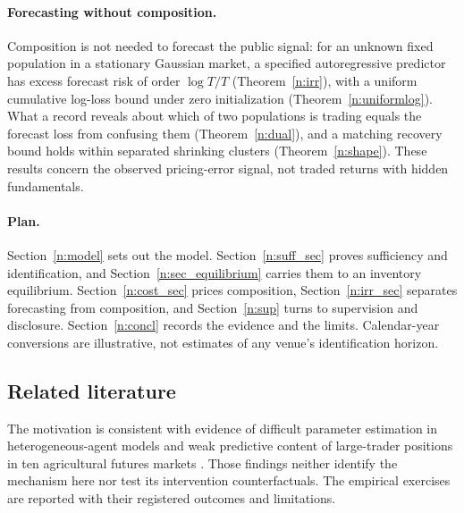 \documentclass[12pt]{article}
\theoremstyle{definition}
\theoremstyle{remark}
\begin{document}
\paragraph{Forecasting without composition.} Composition is not needed to forecast the public signal: for an unknown fixed population in a stationary Gaussian market, a specified autoregressive predictor has excess forecast risk of order $\log T/T$ (Theorem~\ref{n:irr}), with a uniform cumulative log-loss bound under zero initialization (Theorem~\ref{n:uniformlog}). What a record reveals about which of two populations is trading equals the forecast loss from confusing them (Theorem~\ref{n:dual}), and a matching recovery bound holds within separated shrinking clusters (Theorem~\ref{n:shape}). These results concern the observed pricing-error signal, not traded returns with hidden fundamentals.

\paragraph{Plan.} Section~\ref{n:model} sets out the model. Section~\ref{n:suff_sec} proves sufficiency and identification, and Section~\ref{n:sec_equilibrium} carries them to an inventory equilibrium. Section~\ref{n:cost_sec} prices composition, Section~\ref{n:irr_sec} separates forecasting from composition, and Section~\ref{n:sup} turns to supervision and disclosure. Section~\ref{n:concl} records the evidence and the limits. Calendar-year conversions are illustrative, not estimates of any venue's identification horizon.

\subsection{Related literature}\label{n:lit}

The motivation is consistent with evidence of difficult parameter estimation in heterogeneous-agent models \citep{lux2018} and weak predictive content of large-trader positions in ten agricultural futures markets \citep{sanders2009}. Those findings neither identify the mechanism here nor test its intervention counterfactuals. The empirical exercises are reported with their registered outcomes and limitations.
\end{document}
